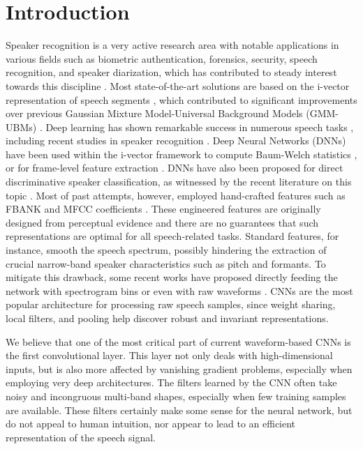 \documentclass{article}
\begin{document}
\section{Introduction}
Speaker recognition is a very active research area with notable applications in various fields such as biometric authentication, forensics, security, speech recognition, and speaker diarization, which has contributed to steady interest towards this discipline \cite{Beigi}. Most state-of-the-art solutions are based on the i-vector representation of speech segments \cite{ivector}, which contributed to significant improvements over previous Gaussian Mixture Model-Universal  Background  Models (GMM-UBMs) \cite{gmm_ubm}. 
Deep learning has shown remarkable success in numerous speech tasks \cite{Goodfellow-et-al-2016-Book,lideng,IEEEexample:intro1,ravanelli_thesis,ravanelli_icassp}, including recent studies in speaker recognition \cite{speaker_rec_dnn,dnn_speaker_rec2}.
Deep Neural Networks (DNNs) have been used within the i-vector framework to compute Baum-Welch statistics \cite{Kenny_deepneural}, or for frame-level feature extraction \cite{bottleneck_spk_rec}.
DNNs have also been proposed for direct discriminative speaker classification, as witnessed by the recent literature on this topic \cite{dnn_spk_rec_class2,dnn_spk_rec_class1,dnn_spk_rec_class3,xvector}. 
Most of past attempts, however, employed hand-crafted features such as FBANK and MFCC coefficients \cite{dnn_spk_rec_class2,dnn_speaker_rec_plp,spk_id_mfcc}. These engineered features are originally designed from perceptual evidence and there are no guarantees that such representations are optimal for all speech-related tasks. Standard features, for instance, smooth the speech spectrum, possibly hindering the extraction of crucial narrow-band speaker characteristics such as pitch and formants. To mitigate this drawback, some recent works have proposed directly feeding the network with spectrogram bins \cite{e2e_spk_id,spk_rec_time_freq,voxceleb} or even with raw waveforms \cite{palaz_raw,tara_raw,google_rawmulti,joint7,tuske,dnn_emotion,wavenet,sample_rnn,acoustic_raw_povey,spoofing_raw,raw_speaker_id,verification_raw_ICASSP2018,verification_raw_IS2018}. CNNs are the most popular architecture for processing raw speech samples, since weight sharing, local filters, and pooling help discover robust and invariant representations. 

We believe that one of the most critical part of current waveform-based CNNs is the first convolutional layer. This layer not only deals with high-dimensional inputs, but is also more affected by vanishing gradient problems, especially when employing very deep architectures. The filters learned by the CNN often take noisy and incongruous multi-band shapes, especially when few training samples are available. These filters certainly make some sense for the neural network, but do not appeal to human intuition, nor appear to lead to an efficient representation of the speech signal. 
\end{document}
